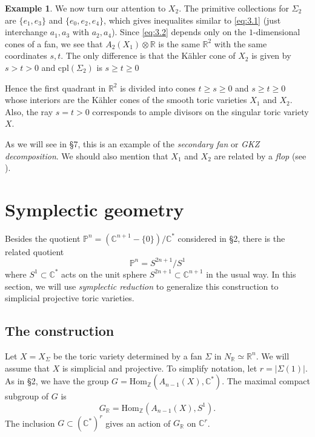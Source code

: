 \documentclass{amsart}
\theoremstyle{plain}
\theoremstyle{definition}
\newtheorem*{example}{Example}
\begin{document}
\begin{example}
	We now turn our attention to $X_2$.  The primitive collections
for $\Sigma_2$ are $\{e_1,e_3\}$ and $\{e_0,e_2,e_4\}$, which gives
inequalites similar to \eqref{eq:3.1} (just interchange $a_1,a_3$ with
$a_2,a_4$).  Since \eqref{eq:3.2} depends only on the $1$-dimensional
cones of a fan, we see that $A_2(X_1)\otimes\mathbb{R}$ is the same
$\mathbb{R}^2$ with the same coordinates $s,t$.  The only difference is
that the K\"ahler cone of $X_2$ is given by $s > t > 0$ and
$\mathrm{cpl}(\Sigma_2)$ is  $s \ge t \ge 0$

	Hence the first quadrant in $\mathbb{R}^2$ is divided into cones
$t \ge s \ge 0$ and $s \ge t \ge 0$ whose interiors are the K\"ahler
cones of the smooth toric varieties $X_1$ and $X_2$.  Also, the
ray $s = t > 0$ corresponds to ample divisors on the singular toric
variety $X$.  
\end{example}

	As we will see in \S7, this is an example of the {\it
secondary fan\/} or {\it GKZ decomposition\/}.  We should also mention
that $X_1$ and $X_2$ are related by a {\it flop\/} (see \cite{Rei2}).

\section{Symplectic geometry}

	Besides the quotient $\mathbb{P}^n = (\mathbb{C}^{n+1}-\{0\})/\mathbb{C}^*$ considered in \S2, there is the related
quotient
\[
\mathbb{P}^n = S^{2n+1}/S^1 
\]
where $S^1 \subset \mathbb{C}^*$ acts on the unit sphere $S^{2n+1}
\subset \mathbb{C}^{n+1}$ in the usual way.  In this section, we will
use {\it symplectic reduction} to generalize this construction to
simplicial projective toric varieties.

	\subsection{The construction} Let $X = X_\Sigma$ be the
toric variety determined by a fan $\Sigma$ in $N_{\mathbb{R}} \simeq
\mathbb{R}^n$.  We will assume that $X$ is simplicial and projective.
To simplify notation, let $r = |\Sigma(1)|$.  As in \S2, we have the
group $G = \mathrm{Hom}_{\mathbb{Z}}(A_{n-1}(X),\mathbb{C}^*)$.  The
maximal compact subgroup of $G$ is
\begin{equation}
G_{\mathbb{R}} = \mathrm{Hom}_{\mathbb{Z}}(A_{n-1}(X),S^1).
\tag{4.1}\label{eq:4.1}
\end{equation}
The inclusion $G \subset (\mathbb{C}^*)^r$ gives an action of $G_{\mathbb{R}}$ on $\mathbb{C}^r$.
\end{document}
